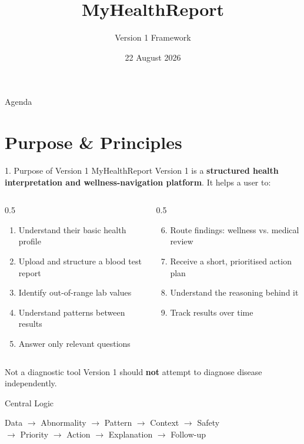 \documentclass[10pt,aspectratio=169]{beamer}
\title[MyHealthReport V1]{MyHealthReport}
\subtitle{Version 1 Framework}
\author{}
\date{22 August 2026}
\begin{document}
\begin{frame}
\titlepage
\end{frame}

\begin{frame}{Agenda}
\tableofcontents
\end{frame}

\section{Purpose \& Principles}

\begin{frame}{1. Purpose of Version 1}
MyHealthReport Version 1 is a \textbf{structured health interpretation and wellness-navigation platform}. It helps a user to:
\begin{columns}[T]
\begin{column}{0.5\textwidth}
\begin{enumerate}
\item Understand their basic health profile
\item Upload and structure a blood test report
\item Identify out-of-range lab values
\item Understand patterns between results
\item Answer only relevant questions
\end{enumerate}
\end{column}
\begin{column}{0.5\textwidth}
\begin{enumerate}\setcounter{enumi}{5}
\item Route findings: wellness vs. medical review
\item Receive a short, prioritised action plan
\item Understand the reasoning behind it
\item Track results over time
\end{enumerate}
\end{column}
\end{columns}
\vfill
\begin{alertblock}{Not a diagnostic tool}
Version 1 should \textbf{not} attempt to diagnose disease independently.
\end{alertblock}
\end{frame}

\begin{frame}{Central Logic}
\begin{center}
\Large
Data $\rightarrow$ Abnormality $\rightarrow$ Pattern $\rightarrow$ Context $\rightarrow$ Safety \\[4pt]
$\rightarrow$ Priority $\rightarrow$ Action $\rightarrow$ Explanation $\rightarrow$ Follow-up
\end{center}
\end{frame}
\end{document}
